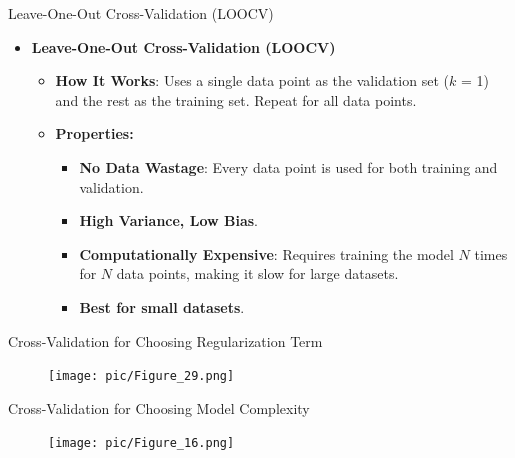 \documentclass[serif, aspectratio=169]{beamer}
\begin{document}
    \begin{frame}{Leave-One-Out Cross-Validation (LOOCV)}
        \begin{itemize}
            \item \textbf{Leave-One-Out Cross-Validation (LOOCV)}
            \medskip
            \begin{itemize}\itemsep1em
            \item \justifying \textbf{How It Works}:
            Uses a single data point as the validation set ($k$ = 1) and the rest as the training set. Repeat for all data points.
            \item \textbf{Properties:}
            \smallskip
            \begin{itemize}\itemsep.5em
            \item \textbf{No Data Wastage}:
            Every data point is used for both training and validation.
            \item \textbf{High Variance, Low Bias}.
            \item \justifying \textbf{Computationally Expensive}:
            Requires training the model $N$ times for $N$ data points, making it slow for large datasets.
            \item \textbf{Best for small datasets}.
            \end{itemize}
            \end{itemize}
        \end{itemize}
    \end{frame}

    \begin{frame}{Cross-Validation for Choosing Regularization Term}
        \begin{figure}
            \centering
            \texttt{[image: pic/Figure\_29.png]}
        \end{figure}
        \vfill
    \end{frame}

    \begin{frame}{Cross-Validation for Choosing Model Complexity}
        \begin{figure}
            \centering
            \texttt{[image: pic/Figure\_16.png]}
        \end{figure}
    \end{frame}
\end{document}
